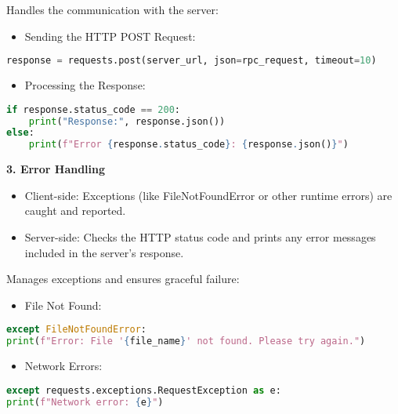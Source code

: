 \documentclass{article}
\begin{document}
Handles the communication with the server:
\begin{itemize}
    \item Sending the HTTP POST Request:
\end{itemize}
\begin{small}
\begin{lstlisting}[language=Python]
    response = requests.post(server_url, json=rpc_request, timeout=10)

\end{lstlisting}
\end{small}
\begin{itemize}
    \item Processing the Response:
\end{itemize}
\begin{small}
\begin{lstlisting}[language=Python]
    if response.status_code == 200:
    print("Response:", response.json())
else:
    print(f"Error {response.status_code}: {response.json()}")

\end{lstlisting}
\end{small}




\textbf{3. Error Handling}

\begin{itemize}
    \item Client-side: Exceptions (like FileNotFoundError or other runtime errors) are caught and reported.
    \item Server-side: Checks the HTTP status code and prints any error messages included in the server's response.
\end{itemize}

Manages exceptions and ensures graceful failure:
\begin{itemize}
    \item File Not Found:
\end{itemize}
\begin{small}
\begin{lstlisting}[language=Python]
except FileNotFoundError:
print(f"Error: File '{file_name}' not found. Please try again.")
\end{lstlisting}
\end{small}
\begin{itemize}
    \item Network Errors:
\end{itemize}
\begin{small}
\begin{lstlisting}[language=Python]
except requests.exceptions.RequestException as e:
print(f"Network error: {e}")
\end{lstlisting}
\end{small}
\end{document}

